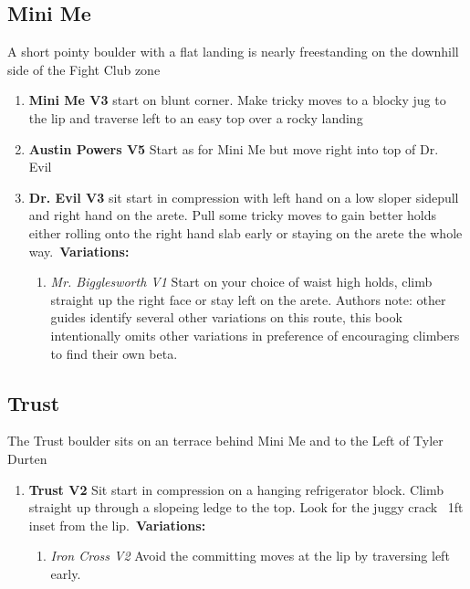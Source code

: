 \subsection*{Mini Me}\label{bf:Mini Me}
A short pointy boulder with a flat landing is nearly freestanding on the downhill side of the Fight Club zone

\begin{enumerate}[resume]
	\item\label{rt:Mini Me} \colorbox{green!20}{\textbf{Mini Me V3  } }
	\newline start on blunt corner. Make tricky moves to a blocky jug to the lip and traverse left to an easy top over a rocky landing\
	\item\label{rt:Austin Powers} \colorbox{RoyalBlue!20}{\textbf{Austin Powers V5    } }
	\newline Start as for Mini Me but move right into top of Dr. Evil\
	\item\label{rt:Dr. Evil} \colorbox{green!20}{\textbf{Dr. Evil V3    } }
	\newline sit start in compression with left hand on a low sloper sidepull and right hand on the arete. Pull some tricky moves to gain better holds either rolling onto the right hand slab early or staying on the arete the whole way.\
	\newline \textbf{Variations:}
	\begin{enumerate}
		\item\label{vr:Mr. Bigglesworth} \colorbox{green!20}{\emph{Mr. Bigglesworth V1 \ding{72} \ding{72}  }  }
		\newline Start on your choice of waist high holds, climb straight up the right face or stay left on the arete. Authors note: other guides identify several other variations on this route, this book intentionally omits other variations in preference of encouraging climbers to find their own beta.\
	\end{enumerate}
\end{enumerate}
\subsection*{Trust}\label{bf:Trust}
The Trust boulder sits on an terrace behind Mini Me and to the Left of Tyler Durten

\begin{enumerate}[resume]
	\item\label{rt:Trust} \colorbox{green!20}{\textbf{Trust V2     } }
	\newline Sit start in compression on a hanging refrigerator block. Climb straight up through a slopeing ledge to the top. Look for the juggy crack ~1ft inset from the lip.\
	\newline \textbf{Variations:}
	\begin{enumerate}
		\item\label{vr:Iron Cross} \colorbox{green!20}{\emph{Iron Cross V2   }  }
		\newline Avoid the committing moves at the lip by traversing left early.\
	\end{enumerate}
\end{enumerate}
